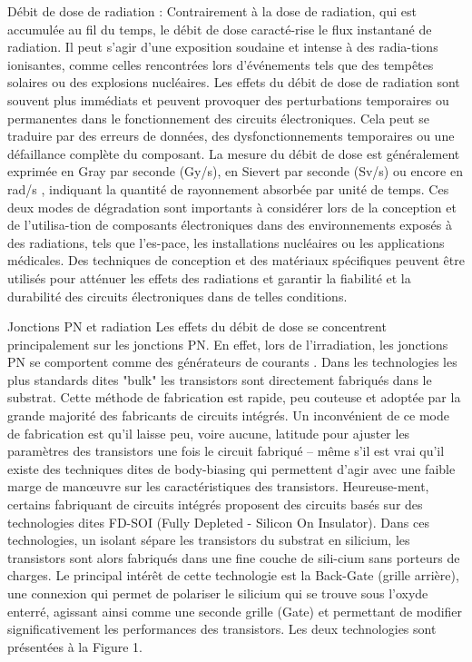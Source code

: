 Débit de dose de radiation :
Contrairement à la dose de radiation, qui est accumulée au fil du temps, le débit de dose caracté-rise le flux instantané de radiation. Il peut s'agir d'une exposition soudaine et intense à des radia-tions ionisantes, comme celles rencontrées lors d'événements tels que des tempêtes solaires ou des explosions nucléaires.
Les effets du débit de dose de radiation sont souvent plus immédiats et peuvent provoquer des perturbations temporaires ou permanentes dans le fonctionnement des circuits électroniques. Cela peut se traduire par des erreurs de données, des dysfonctionnements temporaires ou une défaillance complète du composant.
La mesure du débit de dose est généralement exprimée en Gray par seconde (Gy/s), en Sievert par seconde (Sv/s) ou encore en rad/s  , indiquant la quantité de rayonnement absorbée par unité de temps.
Ces deux modes de dégradation sont importants à considérer lors de la conception et de l'utilisa-tion de composants électroniques dans des environnements exposés à des radiations, tels que l'es-pace, les installations nucléaires ou les applications médicales. Des techniques de conception et des matériaux spécifiques peuvent être utilisés pour atténuer les effets des radiations et garantir la fiabilité et la durabilité des circuits électroniques dans de telles conditions.

Jonctions PN et radiation
Les effets du débit de dose se concentrent principalement sur les jonctions PN. En effet, lors de l'irradiation, les jonctions PN se comportent comme des générateurs de courants .
Dans les technologies les plus standards dites "bulk" les transistors sont directement fabriqués dans le substrat. Cette méthode de fabrication est rapide, peu couteuse et adoptée par la grande majorité des fabricants de circuits intégrés. Un inconvénient de ce mode de fabrication est qu'il laisse peu, voire aucune, latitude pour ajuster les paramètres des transistors une fois le circuit fabriqué – même s’il est vrai qu’il existe des techniques dites de body-biasing qui permettent d’agir avec une faible marge de manœuvre sur les caractéristiques des transistors. Heureuse-ment, certains fabriquant de circuits intégrés proposent des circuits basés sur des technologies dites FD-SOI (Fully Depleted - Silicon On Insulator). Dans ces technologies, un isolant sépare les transistors du substrat en silicium, les transistors sont alors fabriqués dans une fine couche de sili-cium sans porteurs de charges. Le principal intérêt de cette technologie est la Back-Gate (grille arrière), une connexion qui permet de polariser le silicium qui se trouve sous l'oxyde enterré, agissant ainsi comme une seconde grille (Gate) et permettant de modifier significativement les performances des transistors.
Les deux technologies sont présentées à la Figure 1.

